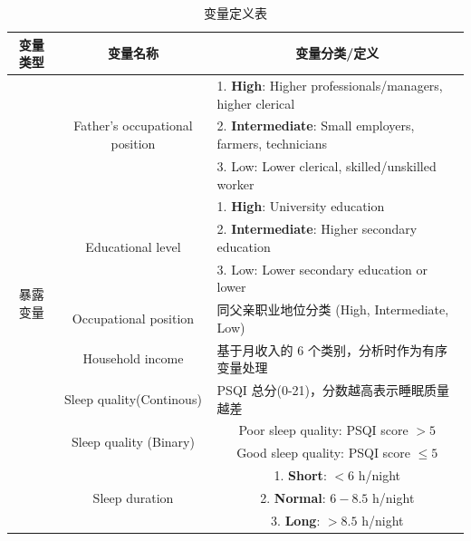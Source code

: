\documentclass[lang=cn,a4paper,newtx,code=minted,codebg=light]{elegantpaper}
\begin{document}
\begin{table}[!htbp]
    \centering
    \caption{变量定义表}
    \label{tab:var_def}
    \begin{tabularx}{\textwidth}{c c X}
        \toprule
        变量类型 & 变量名称 & \multicolumn{1}{c}{变量分类/定义} \\
        \midrule
        \multirow{14}{*}{暴露变量} 
        & \multirow{3}{*}{Father's occupational position} & 1. \textbf{High}: Higher professionals/managers, higher clerical \\
        & & 2. \textbf{Intermediate}: Small employers, farmers, technicians \\
        & & 3. Low: Lower clerical, skilled/unskilled worker \\
        \cmidrule(lr){2-3} %
        
        & \multirow{3}{*}{Educational level} & 1. \textbf{High}: University education \\
        & & 2. \textbf{Intermediate}: Higher secondary education \\
        & & 3. Low: Lower secondary education or lower \\
        \cmidrule(lr){2-3}
        
        & Occupational position & 同父亲职业地位分类 (High, Intermediate, Low) \\
        \cmidrule(lr){2-3}
        
        & Household income & 基于月收入的 6 个类别，分析时作为有序变量处理 \\
        \cmidrule(lr){2-3}
        
        & Sleep quality(Continous) & PSQI 总分(0-21)，分数越高表示睡眠质量越差 \\
        \midrule
        
        \multirow{5}{*}{中介变量} 
        & \multirow{2}{*}{Sleep quality (Binary)} & \multicolumn{1}{c}{Poor sleep quality: PSQI score $> 5$} \\
        & & \multicolumn{1}{c}{Good sleep quality: PSQI score $\le 5$} \\
        \cmidrule(lr){2-3}
        
        & \multirow{3}{*}{Sleep duration} & \multicolumn{1}{c}{1. \textbf{Short}: $<6$ h/night} \\
        & & \multicolumn{1}{c}{2. \textbf{Normal}: $6 - 8.5$ h/night} \\
        & & \multicolumn{1}{c}{3. \textbf{Long}: $>8.5$ h/night} \\
        \midrule
        

\end{tabularx}
\end{table}
\end{document}
